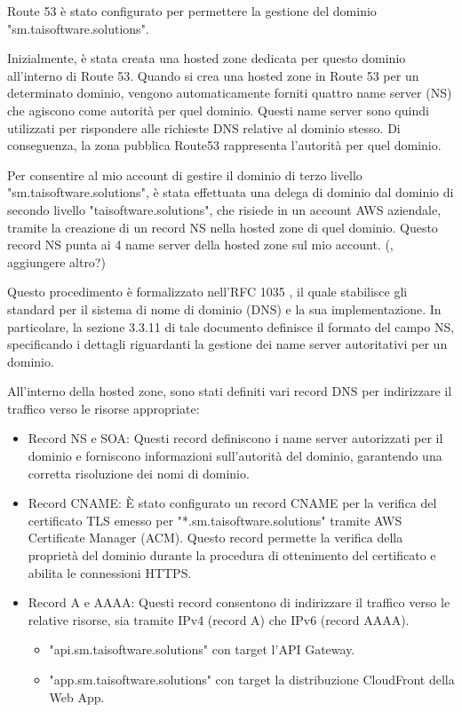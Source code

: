 Route 53 è stato configurato per permettere la gestione del dominio "sm.taisoftware.solutions". 

Inizialmente, è stata creata una hosted zone dedicata per questo dominio all'interno di Route 53. Quando si crea una hosted zone in Route 53 per un determinato dominio, vengono automaticamente forniti quattro name server (NS) che agiscono come autorità per quel dominio. Questi name server sono quindi utilizzati per rispondere alle richieste DNS relative al dominio stesso. Di conseguenza, la zona pubblica Route53 rappresenta l'autorità per quel dominio.

Per consentire al mio account di gestire il dominio di terzo livello "sm.taisoftware.solutions", è stata effettuata una delega di dominio dal dominio di secondo livello "taisoftware.solutions", che risiede in un account AWS aziendale, tramite la creazione di un record NS nella hosted zone di quel dominio. Questo record NS punta ai 4 name server della hosted zone sul mio account. (, aggiungere altro?)

Questo procedimento è formalizzato nell'RFC 1035 \cite{rfc1035}, il quale stabilisce gli standard per il sistema di nome di dominio (DNS) e la sua implementazione. In particolare, la sezione 3.3.11 di tale documento definisce il formato del campo NS, specificando i dettagli riguardanti la gestione dei name server autoritativi per un dominio.

\vspace{0,3cm}

All'interno della hosted zone, sono stati definiti vari record DNS per indirizzare il traffico verso le risorse appropriate:

\begin{itemize}
    \item Record NS e SOA: Questi record definiscono i name server autorizzati per il dominio e forniscono informazioni sull'autorità del dominio, garantendo una corretta risoluzione dei nomi di dominio.
    \item Record CNAME: È stato configurato un record CNAME per la verifica del certificato TLS emesso per "*.sm.taisoftware.solutions" tramite AWS Certificate Manager (ACM). Questo record permette la verifica della proprietà del dominio durante la procedura di ottenimento del certificato e abilita le connessioni HTTPS.
    \item Record A e AAAA: Questi record consentono di indirizzare il traffico verso le relative risorse, sia tramite IPv4 (record A) che IPv6 (record AAAA).
    \begin{itemize}
        \item "api.sm.taisoftware.solutions" con target l'API Gateway.
        \item "app.sm.taisoftware.solutions" con target la distribuzione CloudFront della Web App.
    \end{itemize}
\end{itemize}